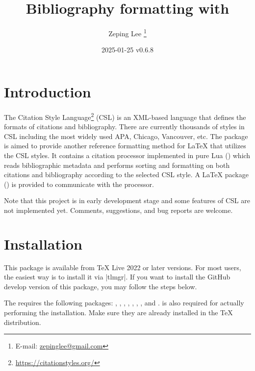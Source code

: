 \documentclass{l3doc}
\begin{document}
\title{%
  Bibliography formatting with 
}

\author{%
  Zeping Lee%
  \thanks{%
    E-mail:
    \href{mailto:zepinglee@gmail.com}
      {zepinglee@gmail.com}%
  }%
}

\date{2025-01-25 v0.6.8}

\maketitle


\begin{documentation}

\section{Introduction}

The Citation Style Language\footnote{\url{https://citationstyles.org/}} (CSL)
is an XML-based language that defines the formats of citations and bibliography.
There are currently thousands of styles in CSL including the most widely used
APA, Chicago, Vancouver, etc.
The  package is aimed to provide another reference formatting method
for LaTeX that utilizes the CSL styles.
It contains a citation processor implemented in pure Lua ()
which reads bibliographic metadata and performs sorting and formatting on both
citations and bibliography according to the selected CSL style.
A LaTeX package () is provided to communicate with the processor.

Note that this project is in early development stage and some features of CSL
are not implemented yet.
Comments, suggestions, and bug reports are welcome.


\section{Installation}

This package is available from TeX Live 2022 or later versions.
For most users, the easiest way is to install it via |tlmgr|.
If you want to install the GitHub develop version of this package,
you may follow the steps below.

The  requires the following packages:
, , , , ,
, , and .
 is also required for actually performing the installation.
Make sure they are already installed in the TeX distribution.


\end{documentation}
\end{document}
